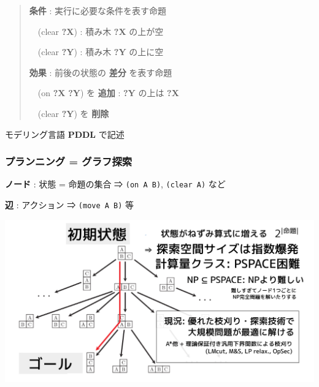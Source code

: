 \begin{container-fluid}
\begin{row-fluid}
\begin{span7}
\begin{quote}
\textbf{条件} : 実行に必要な条件を表す命題

　(clear \textbf{?X}) : 積み木 \textbf{?X} の上が空

　(clear \textbf{?Y}) : 積み木 \textbf{?Y} の上に空

\textbf{効果} : 前後の状態の \textbf{差分} を表す命題

　(on \textbf{?X} \textbf{?Y}) を \textbf{追加} : \textbf{?Y} の上は \textbf{?X}

　(clear \textbf{?Y}) を \textbf{削除}
\end{quote}
\end{span7}
\begin{span5}


\begin{alignright}
\begin{larger}
モデリング言語 \textbf{PDDL} で記述
\end{larger}
\end{alignright}
\end{span5}
\end{row-fluid}
\end{container-fluid}

\subsubsection{プランニング = グラフ探索}
\label{sec:orgheadline52}

\textbf{ノード} : 状態 = 命題の集合 ⇒ \texttt{(on A B)}, \texttt{(clear A)} など

\textbf{辺}     : アクション ⇒ \texttt{(move A B)} 等

\includegraphics{img/graph.png}

